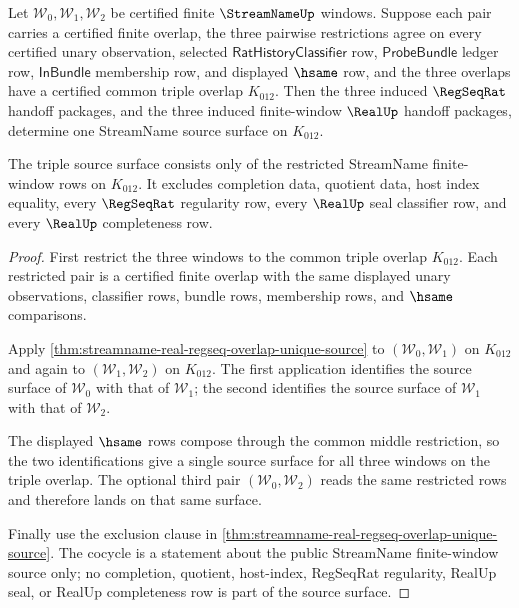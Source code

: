 \begin{theorem}
\label{thm:streamname-regseqrat-triple-overlap-source-cocycle}
Let $\mathcal{W}_0,\mathcal{W}_1,\mathcal{W}_2$ be certified finite
$\StreamNameUp$ windows. Suppose each pair carries a certified finite overlap,
the three pairwise restrictions agree on every certified unary observation,
selected $\mathsf{RatHistoryClassifier}$ row, $\mathsf{ProbeBundle}$ ledger
row, $\mathsf{InBundle}$ membership row, and displayed $\hsame$ row, and the
three overlaps have a certified common triple overlap $K_{012}$. Then the three
induced $\RegSeqRat$ handoff packages, and the three induced finite-window
$\RealUp$ handoff packages, determine one StreamName source surface on
$K_{012}$.

The triple source surface consists only of the restricted StreamName
finite-window rows on $K_{012}$. It excludes completion data, quotient data,
host index equality, every $\RegSeqRat$ regularity row, every $\RealUp$ seal
classifier row, and every $\RealUp$ completeness row.
\end{theorem}
\begin{proof}
First restrict the three windows to the common triple overlap $K_{012}$. Each
restricted pair is a certified finite overlap with the same displayed unary
observations, classifier rows, bundle rows, membership rows, and $\hsame$
comparisons.

Apply \autoref{thm:streamname-real-regseq-overlap-unique-source} to
$(\mathcal{W}_0,\mathcal{W}_1)$ on $K_{012}$ and again to
$(\mathcal{W}_1,\mathcal{W}_2)$ on $K_{012}$. The first application identifies
the source surface of $\mathcal{W}_0$ with that of $\mathcal{W}_1$; the second
identifies the source surface of $\mathcal{W}_1$ with that of
$\mathcal{W}_2$.

The displayed $\hsame$ rows compose through the common middle restriction, so
the two identifications give a single source surface for all three windows on
the triple overlap. The optional third pair
$(\mathcal{W}_0,\mathcal{W}_2)$ reads the same restricted rows and therefore
lands on that same surface.

Finally use the exclusion clause in
\autoref{thm:streamname-real-regseq-overlap-unique-source}. The cocycle is a
statement about the public StreamName finite-window source only; no completion,
quotient, host-index, RegSeqRat regularity, RealUp seal, or RealUp completeness
row is part of the source surface.
\end{proof}

